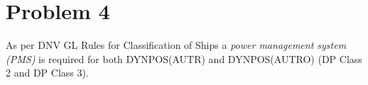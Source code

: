 \section*{Problem 4}

As per DNV GL Rules for Classification of Ships \cite{RulesShipsDNVGLPart6Chap3} a \textit{power management system (PMS)} is required for both DYNPOS(AUTR) and DYNPOS(AUTRO) (DP Class 2 and DP Class 3).

\begin{comment}
Requirements (Section 1.8.4 - Power Management):

\begin{itemize}
    \item Automatic PMS, operating with both open and close bus-tie breakers.
    \item Shall be redundant   
    
    8.4.3 A failure in the power management system shall not cause alteration to the power generation, and
shall initiate an alarm in the DP control centre.

8.4.4 It shall be possible to operate the switchboards in manual as required for the main class, with the
power management system disconnected.

8.4.5 Means shall be implemented in order to prevent overloading of the power plant, e.g. by use of
interlocks, thrust limitations or other means. Means shall also be implemented to prevent reactive overload.
In case trust is reduced by any other system than the DP-control system this shall be communicated to the
DP-control system.

8.4.6 Overload, caused by the stopping of one or more generators subject to common mode failure, shall not
create a black-out. Reduction in load, e.g. thruster pitch or speed reduction shall be introduced to prevent
blackout and enable standby generators to come online.

8.4.7 When generators are running in parallel there shall be protection systems able to detect failures
that may result in a full or partial black-out situation and effectuate actions to prevent such incidents. The
effectuated actions shall be so that the consequence of the failure is minimized. This means that for failures
where the system has sufficient time the faulty component shall be tripped before a full or partial black-out
situation occurs. Such protection systems shall be independent from automatic voltage regulators (AVRs) and
engine governors.

8.4.8 When the system is operating with closed bus-tie breakers between switchboards belonging to
different redundancy groups and the first action performed by the protection system does not remove the
failure, or it is not performed (e.g. due to hidden failure), the protection system shall be able to execute
alternative actions to isolate the faulty component or system before the failure effect could propagate from
one system to another.
\end{itemize}
\end{comment}

